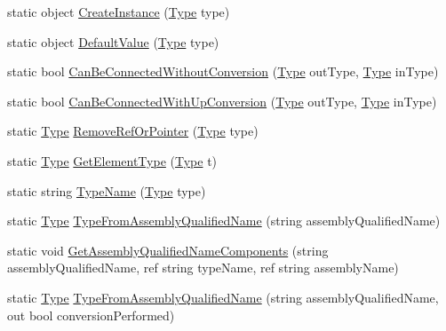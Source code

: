 \begin{DoxyCompactItemize}
\item 
static object \hyperlink{classi_c_s___types_a77c2d9320ad613873b4d715da25bedf9}{Create\+Instance} (\hyperlink{i_c_s___object_type_enum_8cs_ae6c3dd6d8597380b56d94908eb431547aa1fa27779242b4902f7ae3bdd5c6d508}{Type} type)
\item 
static object \hyperlink{classi_c_s___types_a4237891ba30b99e7dbd3add87288c1d9}{Default\+Value} (\hyperlink{i_c_s___object_type_enum_8cs_ae6c3dd6d8597380b56d94908eb431547aa1fa27779242b4902f7ae3bdd5c6d508}{Type} type)
\item 
static bool \hyperlink{classi_c_s___types_a38f0eced92c5878a558ff55fcc9aead3}{Can\+Be\+Connected\+Without\+Conversion} (\hyperlink{i_c_s___object_type_enum_8cs_ae6c3dd6d8597380b56d94908eb431547aa1fa27779242b4902f7ae3bdd5c6d508}{Type} out\+Type, \hyperlink{i_c_s___object_type_enum_8cs_ae6c3dd6d8597380b56d94908eb431547aa1fa27779242b4902f7ae3bdd5c6d508}{Type} in\+Type)
\item 
static bool \hyperlink{classi_c_s___types_a7a21fa671d2a68517334ad1383790fd3}{Can\+Be\+Connected\+With\+Up\+Conversion} (\hyperlink{i_c_s___object_type_enum_8cs_ae6c3dd6d8597380b56d94908eb431547aa1fa27779242b4902f7ae3bdd5c6d508}{Type} out\+Type, \hyperlink{i_c_s___object_type_enum_8cs_ae6c3dd6d8597380b56d94908eb431547aa1fa27779242b4902f7ae3bdd5c6d508}{Type} in\+Type)
\item 
static \hyperlink{i_c_s___object_type_enum_8cs_ae6c3dd6d8597380b56d94908eb431547aa1fa27779242b4902f7ae3bdd5c6d508}{Type} \hyperlink{classi_c_s___types_a473c0cb97544b7db451ace8c707306f6}{Remove\+Ref\+Or\+Pointer} (\hyperlink{i_c_s___object_type_enum_8cs_ae6c3dd6d8597380b56d94908eb431547aa1fa27779242b4902f7ae3bdd5c6d508}{Type} type)
\item 
static \hyperlink{i_c_s___object_type_enum_8cs_ae6c3dd6d8597380b56d94908eb431547aa1fa27779242b4902f7ae3bdd5c6d508}{Type} \hyperlink{classi_c_s___types_a9486fe6aacbd28b2d17390ceffd506d1}{Get\+Element\+Type} (\hyperlink{i_c_s___object_type_enum_8cs_ae6c3dd6d8597380b56d94908eb431547aa1fa27779242b4902f7ae3bdd5c6d508}{Type} t)
\item 
static string \hyperlink{classi_c_s___types_a7b2f27e8a2717fa7825b814911d51561}{Type\+Name} (\hyperlink{i_c_s___object_type_enum_8cs_ae6c3dd6d8597380b56d94908eb431547aa1fa27779242b4902f7ae3bdd5c6d508}{Type} type)
\item 
static \hyperlink{i_c_s___object_type_enum_8cs_ae6c3dd6d8597380b56d94908eb431547aa1fa27779242b4902f7ae3bdd5c6d508}{Type} \hyperlink{classi_c_s___types_a32ad733a51a4d7086d377edf6194ff0e}{Type\+From\+Assembly\+Qualified\+Name} (string assembly\+Qualified\+Name)
\item 
static void \hyperlink{classi_c_s___types_acecd92726d81918dee74294b97213d28}{Get\+Assembly\+Qualified\+Name\+Components} (string assembly\+Qualified\+Name, ref string type\+Name, ref string assembly\+Name)
\item 
static \hyperlink{i_c_s___object_type_enum_8cs_ae6c3dd6d8597380b56d94908eb431547aa1fa27779242b4902f7ae3bdd5c6d508}{Type} \hyperlink{classi_c_s___types_a845342e7e80d43ea3471fe7f35d25e66}{Type\+From\+Assembly\+Qualified\+Name} (string assembly\+Qualified\+Name, out bool conversion\+Performed)
\end{DoxyCompactItemize}
